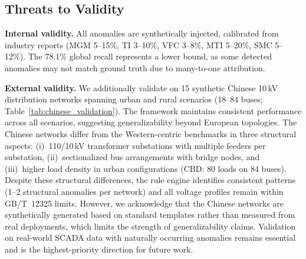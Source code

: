 \documentclass[research]{fcs}
\begin{document}
\subsection{Threats to Validity}

\textbf{Internal validity.} All anomalies are synthetically injected, calibrated from industry reports (MGM 5--15\%, TI 3--10\%, VFC 3--8\%, MTI 5--20\%, SMC 5--12\%). The 78.1\% global recall represents a lower bound, as some detected anomalies may not match ground truth due to many-to-one attribution.

\textbf{External validity.} We additionally validate on 15 synthetic Chinese 10\,kV distribution networks spanning urban and rural scenarios (18--84 buses; Table~\ref{tab:chinese_validation}). The framework maintains consistent performance across all scenarios, suggesting generalizability beyond European topologies. The Chinese networks differ from the Western-centric benchmarks in three structural aspects: (i)~110/10\,kV transformer substations with multiple feeders per substation, (ii)~sectionalized bus arrangements with bridge nodes, and (iii)~higher load density in urban configurations (CBD: 80 loads on 84 buses). Despite these structural differences, the rule engine identifies consistent patterns (1--2 structural anomalies per network) and all voltage profiles remain within GB/T~12325 limits. However, we acknowledge that the Chinese networks are synthetically generated based on standard templates rather than measured from real deployments, which limits the strength of generalizability claims. Validation on real-world SCADA data with naturally occurring anomalies remains essential and is the highest-priority direction for future work.
\end{document}
